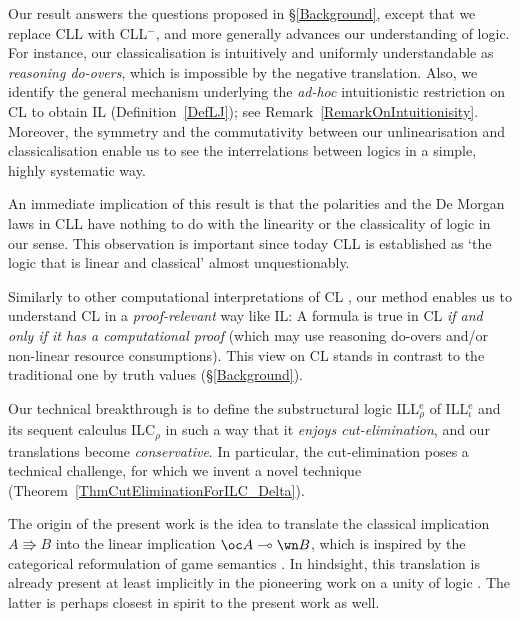 \documentclass[a4paper]{article}
\theoremstyle{definition}
\theoremstyle{theorem}
\theoremstyle{remark}
\begin{document}
Our result answers the questions proposed in \S\ref{Background}, except that we replace CLL with CLL$^-$, and more generally advances our understanding of logic.
For instance, our classicalisation is intuitively and uniformly understandable as \emph{reasoning do-overs}, which is impossible by the negative translation.
Also, we identify the general mechanism underlying the \emph{ad-hoc} intuitionistic restriction on CL to obtain IL (Definition~\ref{DefLJ}); see Remark~\ref{RemarkOnIntuitionisity}.
Moreover, the symmetry and the commutativity between our unlinearisation and classicalisation enable us to see the interrelations between logics in a simple, highly systematic way.

An immediate implication of this result is that the polarities and the De Morgan laws in CLL have nothing to do with the linearity or the classicality of logic in our sense.
This observation is important since today CLL is established as `the logic that is linear and classical' almost unquestionably. %
\fi

Similarly to other computational interpretations of CL \cite{filinski1989declarative,griffin1989formulae,murthy1991evaluation,girard1991new,parigot1992lambdamu,danos1997new,herbelin2000duality,wadler2003call}, our method enables us to understand CL in a \emph{proof-relevant} way like IL: A formula is true in CL \emph{if and only if it has a computational proof} (which may use reasoning do-overs and/or non-linear resource consumptions).
This view on CL stands in contrast to the traditional one by truth values (\S\ref{Background}).

Our technical breakthrough is to define the substructural logic ILL$^{\text{e}}_\rho$ of ILL$^{\text{e}}_\iota$ and its sequent calculus \textsf{ILC}$_\rho$ in such a way that it \emph{enjoys cut-elimination}, and our translations become \emph{conservative}.
In particular, the cut-elimination poses a technical challenge, for which we invent a novel technique (Theorem~\ref{ThmCutEliminationForILC_Delta}).


The origin of the present work is the idea to translate the classical implication $A \Rrightarrow B$ into the linear implication $\oc A \multimap \wn B$, which is inspired by the categorical reformulation of game semantics \cite{harmer2007categorical}.
In hindsight, this translation is already present at least implicitly in the pioneering work on a unity of logic \cite{girard1993unity}.
The latter is perhaps closest in spirit to the present work as well.
\fi
\end{document}
